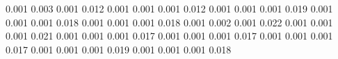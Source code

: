 0.001      0.003      %
0.001      0.012      %
0.001      0.001      %
0.001      0.012      %
0.001      0.001      %
0.001      0.019      %
0.001      0.001      %
0.001      0.018      %
0.001      0.001      %
0.001      0.018      %
0.001      0.002      %
0.001      0.022      %
0.001      0.001      %
0.001      0.021      %
0.001      0.001      %
0.001      0.017      %
0.001      0.001      %
0.001      0.017      %
0.001      0.001      %
0.001      0.017      %
0.001      0.001      %
0.001      0.019      %
0.001      0.001      %
0.001      0.018      %
